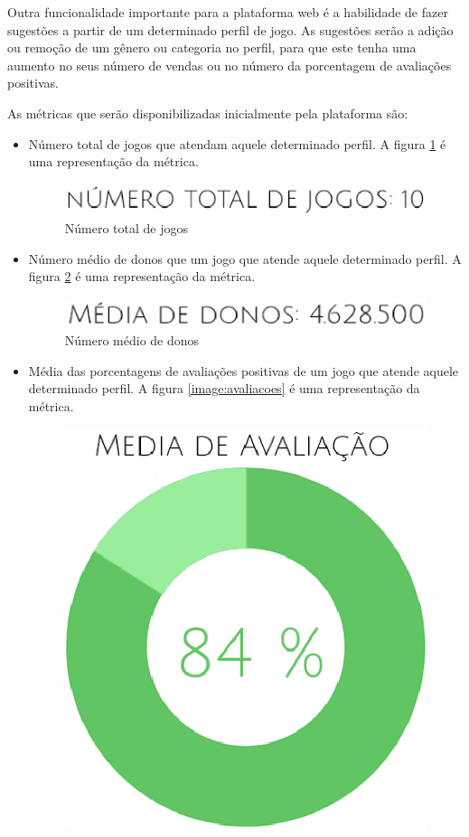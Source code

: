 Outra funcionalidade importante para a plataforma web é a habilidade de fazer sugestões a partir de um determinado perfil de jogo. As sugestões serão a adição ou remoção de um gênero ou categoria no perfil, para que este tenha uma aumento no seus número de vendas ou no número da porcentagem de avaliações positivas.

As métricas que serão disponibilizadas inicialmente pela plataforma são:
\begin{itemize}
	\item Número total de jogos que atendam aquele determinado perfil. A figura \ref{image:num_total} é uma representação da métrica.
	\begin{figure}
	\centering
	\includegraphics[scale=0.5]{figuras/num_jogos.eps}
	\caption{Número total de jogos}
	\label{image:num_total}
	\end{figure}
	\item Número médio de donos que um jogo que atende aquele determinado perfil. A figura \ref{image:med_donos} é uma representação da métrica.
	\begin{figure}
	\centering
	\includegraphics[scale=0.5]{figuras/media_donos.eps}
	\caption{Número médio de donos}
	\label{image:med_donos}
	\end{figure}
	\item Média das porcentagens de avaliações positivas de um jogo que atende aquele determinado perfil. A figura \ref{image:avaliacoes} é uma representação da métrica.
	\begin{figure}
	\centering
	\includegraphics[scale=0.3]{figuras/avaliacao.eps}

\end{figure}
\end{itemize}

